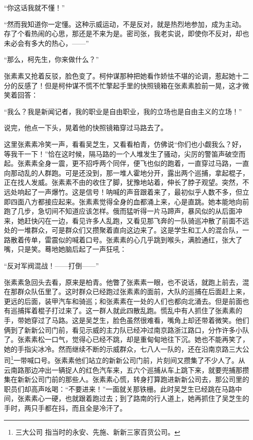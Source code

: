 \par “你这话我就不懂！”
\par “然而我知道你一定懂。这种示威运动，不是反对，就是热烈地参加，成为主动。存了个看热闹的心思，那还是不来为是。密司张，我老实说，即使你不反对，却也未必会有多大的热心，——”
\par “那么，柯先生，你来做什么？”
\par 张素素又抢着反驳，脸色变了。柯仲谋那种把她看作娇怯不堪的论调，惹起她十二分的反感了！但是柯仲谋不慌不忙擎起手里的快照镜箱在张素素脸前一晃，这才微笑着回答：
\par “我么？我是新闻记者，我的职业是自由职业，我的立场也是自由主义的立场！”
\par 说完，他点一下头，晃着他的快照镜箱穿过马路去了。
\par 这里张素素冷笑一声，看看吴芝生，又看看柏青，仿佛说“你们也小觑我么？好，等我干一下！”恰在这时候，隔马路的一个人堆发生了骚动，尖厉的警笛声破空而起。张素素全身一震，更不招呼两个同伴，便飞也似的跑着，一直穿过马路，一直向那动乱的人群跑。可是还没到，那一堆人霍地分开，露出两个巡捕，拿起棍子，正在找人发威。张素素不由的收住了脚，犹豫地站着，伸长了脖子观望。突然，不远处响起了一声爆竹。这是信号！呐喊的声音跟着来了，最初似乎人数不多，但立即四面八方都接应起来。张素素觉得全身的血都涌上来，心是直跳。她本能地向前跑了几步，急切间不知道应该怎样。俄而猛听得一片马蹄声，暴风似的从后面冲来，她赶快闪在一边，看见许多人乱跑，又看见那飞奔的一队骑巡冲散了前面不远处的一堆群众，可是群众们又攒聚着直向这边来了。这是学生和工人的混合队，一路散着传单，雷震似的喊着口号。张素素的心几乎跳到喉头，满脸通红，张大了嘴，只是笑。蓦地她脑后起了一声狂吼：
\par “反对军阀混战！——打倒——”
\par 张素素急回头去看，原来是柏青。他瞥了张素素一眼，也不说话，就跑上前去，混在那群众队伍里了。这时群众已经跑过张素素的面前，大队的巡捕在后面赶上来，更远的后面，装甲汽车和骑巡；和张素素在一处的人们也都向北涌去。但是前面也有巡捕挥着棍子打过来了。这一群人就此四散乱跑。慌乱中有人抓住了张素素的手，带她穿过了马路。这是吴芝生，脸色虽然很难看，嘴角上却还带着微笑。他们俩到了新新公司门前，看见示威的主力队已经冲过南京路浙江路口，分作许多小队了。张素素松一口气，觉得心已经不跳，却是重甸甸地往下沉。她也不能再笑了，她的手指尖冰冷。然而继续不断的示威群众，七八人一队的，还在沿南京路三大公司\footnote{三大公司 指当时的永安、先施、新新三家百货公司。}一带喊口号。张素素他们站立的新新公司门前，片刻间又攒集了不少人了。从云南路那边冲出一辆捉人的红色汽车来，五六个巡捕从车上跳下来，就要兜捕那攒集在新新公司门前的那些人。张素素心慌，转身打算跑进新新公司去，那公司里的职员们却高声吆喝：“不要进来！”一面就关那铁栅。此时吴芝生已经跳在马路中间，张素素心一硬，也就跟着跑过去；到了路南的行人道上，她再抓住了吴芝生的手时，两只手都在抖，而且全是冷汗了。
